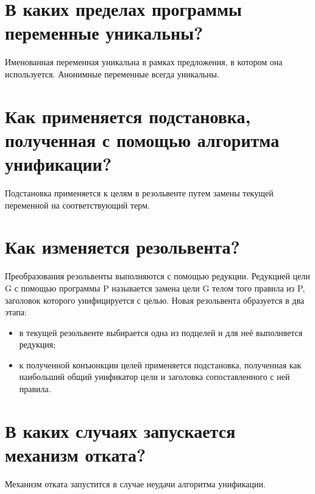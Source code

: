 \section{В каких пределах программы переменные уникальны?}

Именованная переменная уникальна в рамках предложения, в котором она используется. Анонимные переменные всегда уникальны.

\section{Как применяется подстановка, полученная с помощью алгоритма унификации?}

Подстановка применяется к целям в резольвенте путем замены текущей переменной на соответствующий терм.

\section{Как изменяется резольвента?}

Преобразования резольвенты выполняются с помощью редукции. Редукцией цели G с помощью программы P называется замена цели G телом того правила из P, заголовок которого унифицируется с целью. Новая резольвента образуется в два этапа:
\begin{itemize}
    \item в текущей резольвенте выбирается одна из подцелей и для неё выполняется редукция;
    \item к полученной конъюнкции целей применяется подстановка, полученная как наибольший общий унификатор цели и заголовка сопоставленного с ней правила.
\end{itemize}

\section{В каких случаях запускается механизм отката?}

Механизм отката запустится в случае неудачи алгоритма унификации.